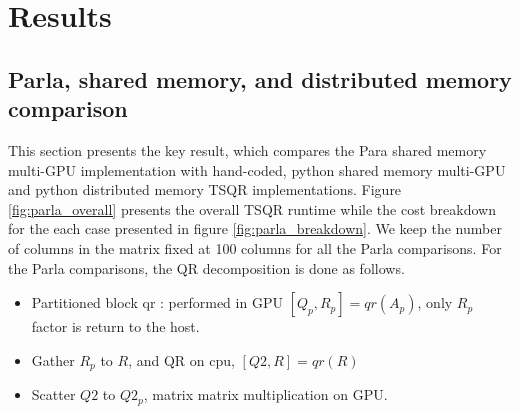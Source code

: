 \documentclass{article}
\begin{document}
\section{Results}

\subsection{Parla, shared memory, and distributed memory comparison}
This section presents the key result, which compares the Para shared memory multi-GPU implementation with hand-coded, python shared memory multi-GPU and python distributed memory TSQR implementations. Figure \ref{fig:parla_overall} presents the overall TSQR runtime while the cost breakdown for the each case presented in figure \ref{fig:parla_breakdown}. We keep the number of columns in the matrix fixed at 100 columns for all the Parla comparisons. For the Parla comparisons, the QR decomposition is done as follows.
\begin{itemize}
    \item Partitioned block qr : performed in GPU $[Q_p,R_p]=qr(A_p)$, only $R_p$ factor is return to the host. 
    \item Gather $R_p$ to $R$, and QR on cpu, $[Q2,R]=qr(R)$
    \item Scatter $Q2$ to $Q2_p$, matrix matrix multiplication on GPU. 
\end{itemize}
\end{document}
